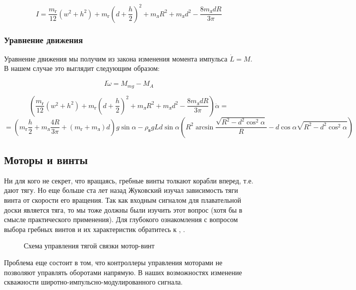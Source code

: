 \documentclass[12pt,a4paper]{article}
\begin{document}
$$ I = \frac{m_\text{г}}{12}(w^2 + h^2) + m_\text{г}(d + \frac{h}{2})^2 + m_\text{л}R^2 + m_\text{л}d^2 - \frac{8m_\text{л}dR}{3\pi}$$

\subsubsection{Уравнение движения}

Уравнение движения мы получим из закона изменения момента импульса $\dot{L} = M$. В нашем случае это выглядит следующим образом:

$$ I\dot{\omega} = M_{mg} - M_A $$

$$ (\frac{m_\text{г}}{12}(w^2 + h^2) + m_\text{г}(d + \frac{h}{2})^2 + m_\text{л}R^2 + m_\text{л}d^2 - \frac{8m_\text{л}dR}{3\pi})\ddot{\alpha} = $$
$$ = (m_\text{г}\frac{h}{2} + m_\text{л}\frac{4R}{3\pi} + (m_\text{г} + m_\text{л})d)g\sin\alpha -  \rho_\text{в}gLd\sin\alpha (R^2 \arcsin\frac{\sqrt{R^2-d^2\cos^2\alpha}}{R} - d\cos\alpha\sqrt{R^2-d^2\cos^2\alpha}) $$


\subsection{Моторы и винты}

Ни для кого не секрет, что вращаясь, гребные винты толкают корабли вперед, т.е. дают тягу. Но еще больше ста лет назад Жуковский изучал зависимость тяги винта от скорости его вращения. Так как входным сигналом для плавательной доски является тяга, то мы тоже должны были изучить этот вопрос (хотя бы в смысле практического применения). Для глубокого ознакомления с вопросом выбора гребных винтов и их характеристик обратитесь к \cite{voitkunski_teoria_korabl}, \cite{vaganov_tyaga_sudov}. 

\begin{figure}[h]
	\caption{Схема управления тягой связки мотор-винт}
\end{figure}

Проблема еще состоит в том, что контроллеры управления моторами не позволяют управлять оборотами напрямую. В наших возможностях изменение скважности широтно-импульсно-модулированного сигнала. 
\end{document}

